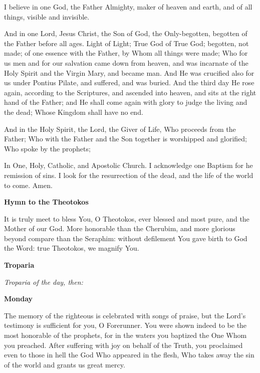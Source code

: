 \begin{hang}
\noindent{}I believe in one God, the Father Almighty, 
maker of heaven and earth, and of all things, visible and invisible.

And in one Lord, Jesus Christ, the Son of God, the Only-begotten, begotten of the Father before all ages.  Light of Light; True God of True God; begotten, not made; of one essence with the Father, by Whom all things were made; Who for us men and for our salvation came down from heaven, and was incarnate of the Holy Spirit and the Virgin Mary, and became man.  And He was crucified also for us under Pontius Pilate, and suffered, and was buried.  And the third day He rose again, according to the Scriptures, and ascended into heaven, and sits at the right hand of the Father; and He shall come again with glory to judge the living and the dead; Whose Kingdom shall have no end.

And in the Holy Spirit, the Lord, the Giver of Life, Who proceeds from the 
Father; Who with the Father and the Son together is worshipped and glorified; 
Who spoke by the prophets;

In One, Holy, Catholic, and Apostolic Church.  I acknowledge one Baptism for he 
remission of sins.  I look for the resurrection of the dead, and the life of 
the world to come.  Amen.

\end{hang}

\begin{center}
\textbf{Hymn to the Theotokos}
\end{center}

\begin{hang}
\noindent{}It is truly meet to bless You, O Theotokos, 
ever blessed and most pure, and the Mother of our God.  More honorable than the 
Cherubim, and more glorious beyond compare than the Seraphim: without 
defilement You gave birth to God the Word: true Theotokos, we magnify You.

\end{hang}

\begin{center}
\textbf{Troparia}
\end{center}

\noindent
\textit{Troparia of the day, then:}
 
\begin{center}
\textbf{Monday}
\end{center}

\begin{hang}
\noindent{}The memory of the righteous is celebrated 
with songs of praise, but the Lord's testimony is sufficient for you, O 
Forerunner.  You were shown indeed to be the most honorable of the prophets, 
for in the waters you baptized the One Whom you preached.  After suffering 
with  joy on behalf of the Truth, you proclaimed even to those in hell the God 
Who appeared in the flesh, Who takes away the sin of the world and grants us 
great mercy.

\end{hang}

